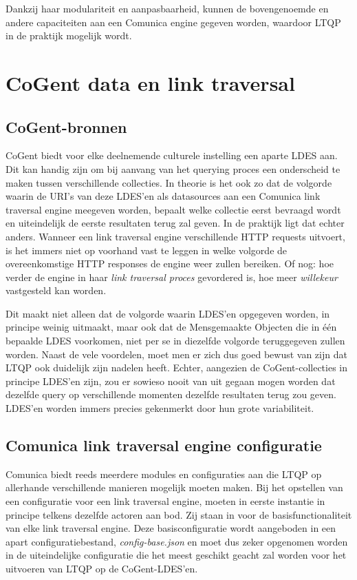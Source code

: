 \documentclass[conference]{IEEEtran}
\begin{document}
Dankzij haar modulariteit en aanpasbaarheid, kunnen de bovengenoemde en andere capaciteiten aan een Comunica engine gegeven worden, waardoor LTQP in de praktijk mogelijk wordt. \cite{taelman2018comunica} \cite{taelman2019lt}

\section{CoGent data en link traversal}

\subsection{CoGent-bronnen}
CoGent biedt voor elke deelnemende culturele instelling een aparte LDES aan. Dit kan handig zijn om bij aanvang van het querying proces een onderscheid te maken tussen verschillende collecties. In theorie is het ook zo dat de volgorde waarin de URI's van deze LDES'en als datasources aan een Comunica link traversal engine meegeven worden, bepaalt welke collectie eerst bevraagd wordt en uiteindelijk de eerste resultaten terug zal geven. In de praktijk ligt dat echter anders. Wanneer een link traversal engine verschillende HTTP requests uitvoert, is het immers niet op voorhand vast te leggen in welke volgorde de overeenkomstige HTTP responses de engine weer zullen bereiken. Of nog: hoe verder de engine in haar \textit{link traversal proces} gevordered is, hoe meer \textit{willekeur} vastgesteld kan worden.

Dit maakt niet alleen dat de volgorde waarin LDES'en opgegeven worden, in principe weinig uitmaakt, maar ook dat de Mensgemaakte Objecten die in één bepaalde LDES voorkomen, niet per se in diezelfde volgorde teruggegeven zullen worden. Naast de vele voordelen, moet men er zich dus goed bewust van zijn dat LTQP ook duidelijk zijn nadelen heeft. Echter, aangezien de CoGent-collecties in principe LDES'en zijn, zou er sowieso nooit van uit gegaan mogen worden dat dezelfde query op verschillende momenten dezelfde resultaten terug zou geven. LDES'en worden immers precies gekenmerkt door hun grote variabiliteit.

\subsection{Comunica link traversal engine configuratie}
Comunica biedt reeds meerdere modules en configuraties aan die LTQP op allerhande verschillende manieren mogelijk moeten maken. Bij het opstellen van een configuratie voor een link traversal engine, moeten in eerste instantie in principe telkens dezelfde actoren aan bod. Zij staan in voor de basisfunctionaliteit van elke link traversal engine. Deze basisconfiguratie wordt aangeboden in een apart configuratiebestand, \textit{config-base.json} en moet dus zeker opgenomen worden in de uiteindelijke configuratie die het meest geschikt geacht zal worden voor het uitvoeren van LTQP op de CoGent-LDES'en.
\end{document}
